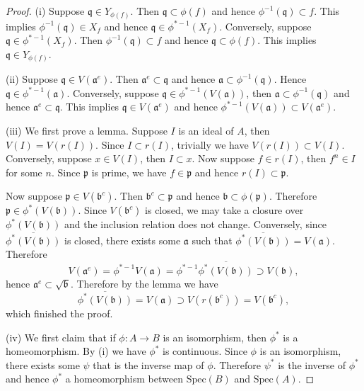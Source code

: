 \begin{proof}
(i) Suppose $\mathfrak{q}\in Y_{\phi(f)}$. Then $\mathfrak{q}\subset\phi(f)$ and hence $\phi^{-1}(\mathfrak{q})\subset f$. This implies $\phi^{-1}(\mathfrak{q})\in X_f$ and hence $\mathfrak{q}\in\phi^{*-1}(X_f)$. Conversely, suppose $\mathfrak{q}\in\phi^{*-1}(X_f)$. Then $\phi^{-1}(\mathfrak{q})\subset f$ and hence $\mathfrak{q}\subset\phi(f)$. This implies $\mathfrak{q}\in Y_{\phi(f)}$. \par
(ii) Suppose $\mathfrak{q}\in V(\mathfrak{a}^e)$. Then $\mathfrak{a}^e\subset\mathfrak{q}$ and hence $\mathfrak{a}\subset\phi^{-1}(\mathfrak{q})$. Hence $\mathfrak{q}\in\phi^{*-1}(\mathfrak{a})$. Conversely, suppose $\mathfrak{q}\in\phi^{*-1}(V(\mathfrak{a}))$, then $\mathfrak{a}\subset\phi^{-1}(\mathfrak{q})$ and hence $\mathfrak{a}^e\subset\mathfrak{q}$. This implies $\mathfrak{q}\in V(\mathfrak{a}^e)$ and hence $\phi^{*-1}(V(\mathfrak{a}))\subset V(\mathfrak{a}^e)$.\par
(iii) We first prove a lemma. Suppose $I$ is an ideal of $A$, then $V(I)=V(r(I))$. Since $I\subset r(I)$, trivially we have $V(r(I))\subset V(I)$. Conversely, suppose $x\in V(I)$, then $I\subset x$. Now suppose $f\in r(I)$, then $f^n\in I$ for some $n$. Since $\mathfrak{p}$ is prime, we have $f\in\mathfrak{p}$ and hence $r(I)\subset\mathfrak{p}$.\par
Now suppose $\mathfrak{p}\in V(\mathfrak{b}^c)$. Then $\mathfrak{b}^c\subset\mathfrak{p}$ and hence $\mathfrak{b}\subset\phi(\mathfrak{p})$. Therefore $\mathfrak{p}\in\phi^*(V(\mathfrak{b}))$. Since $V(\mathfrak{b}^c)$ is closed, we may take a closure over $\phi^*(V(\mathfrak{b}))$ and the inclusion relation does not change. Conversely, since $\overline{\phi^*(V(\mathfrak{b}))}$ is closed, there exists some $\mathfrak{a}$ such that $\overline{\phi^*(V(\mathfrak{b}))}=V(\mathfrak{a})$. Therefore 
$$
V\left( \mathfrak{a} ^e \right) =\phi ^{*-1}V\left( \mathfrak{a} \right) =\phi ^{*-1}\overline{\phi ^*\left( V\left( \mathfrak{b} \right) \right) }\supset V\left( \mathfrak{b} \right) ,
$$
hence $\mathfrak{a} ^e\subset \sqrt{\mathfrak{b}}$. Therefore by the lemma we have 
$$
\overline{\phi ^*\left( V\left( \mathfrak{b} \right) \right) }=V\left( \mathfrak{a} \right) \supset V\left( r\left( \mathfrak{b} ^c \right) \right) =V\left( \mathfrak{b} ^c \right) ,
$$
which finished the proof.\par
(iv) We first claim that if $\phi:A\to B$ is an isomorphism, then $\phi^*$ is a homeomorphism. By (i) we have $\phi^*$ is continuous. Since $\phi$ is an isomorphism, there exists some $\psi$ that is the inverse map of $\phi$. Therefore $\psi^*$ is the inverse of $\phi^*$ and hence $\phi^*$ a homeomorphism between $\mathrm{Spec}(B)$ and $\mathrm{Spec}(A)$.\par

\end{proof}
